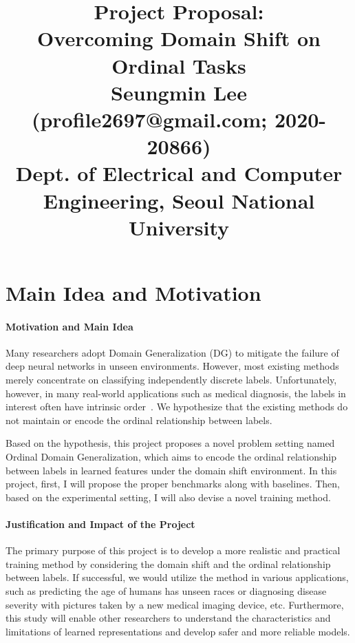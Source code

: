 \documentclass[10pt,twocolumn,letterpaper]{article}
\begin{document}
\title{Project Proposal: \\ Overcoming Domain Shift on Ordinal Tasks \\{\rm {\normalsize Seungmin Lee \\ (profile2697@gmail.com; 2020-20866) \\Dept. of Electrical and Computer Engineering, Seoul National University}}} 

\maketitle
\thispagestyle{empty}


\section{Main Idea and Motivation}
\paragraph{Motivation and Main Idea}  Many researchers adopt Domain Generalization (DG) to mitigate the failure of deep neural networks in unseen environments. However, most existing methods merely concentrate on classifying independently discrete labels. Unfortunately, however, in many real-world applications such as medical diagnosis, the labels in interest often have intrinsic order~\cite{RCG}.
We hypothesize that the existing methods do not maintain or encode the ordinal relationship between labels.

Based on the hypothesis, this project proposes a novel problem setting named Ordinal Domain Generalization, which aims to encode the ordinal relationship between labels in learned features under the domain shift environment. In this project, first, I will propose the proper benchmarks along with baselines. Then, based on the experimental setting, I will also devise a novel training method.

\paragraph{Justification and Impact of the Project}
The primary purpose of this project is to develop a more realistic and practical training method by considering the domain shift and the ordinal relationship between labels. If successful, we would utilize the method in various applications, such as predicting the age of humans has unseen races or diagnosing disease severity with pictures taken by a new medical imaging device, etc. Furthermore, this study will enable other researchers to understand the characteristics and limitations of learned representations and develop safer and more reliable models.
\end{document}
